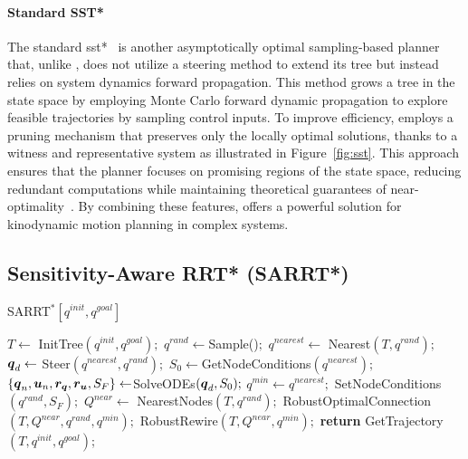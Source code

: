 \paragraph{Standard SST*}

The standard \gls{sst*}~\cite{cSST} is another asymptotically optimal sampling-based planner that, unlike , does not utilize a steering method to extend its tree but instead relies on system dynamics forward propagation.
This method grows a tree in the state space by employing Monte Carlo forward dynamic propagation to explore feasible trajectories by sampling control inputs.
To improve efficiency,  employs a pruning mechanism that preserves only the locally optimal solutions, thanks to a witness and representative system as illustrated in Figure~\ref{fig:sst}.
This approach ensures that the planner focuses on promising regions of the state space, reducing redundant computations while maintaining theoretical guarantees of near-optimality~\cite{cSST}. 
By combining these features,  offers a powerful solution for kinodynamic motion planning in complex systems.

\subsection{Sensitivity-Aware RRT* (SARRT*)}\label{sec:sarrt*}

\begin{algorithm}[h!]
    \caption{SARRT$^* [q^{init}, q^{goal}]$}\label{alg:SARRT*}
    \begin{algorithmic}[1]
        \State $T \gets$ InitTree$({q^{init}, q^{goal}});$
            \State $q^{rand} \gets $Sample()$;$
            \State $q^{nearest} \gets$ Nearest$(T,{q^{rand}});$
            \State $\boldsymbol{q}_d \gets$ Steer$({q^{nearest}},{q^{rand}});$
            \State $S_0 \gets $GetNodeConditions$({q^{nearest}});$
            \State $\left \{\boldsymbol{q}_n, \boldsymbol{u}_n, \boldsymbol{r_q}, \boldsymbol{r_u}, S_F \right \}  \gets $SolveODEs$(\boldsymbol{q}_d, S_0);$
                \State $q^{min} \gets q^{nearest};$
                \State SetNodeConditions$({q^{rand}}, S_{F});$
                \State $Q^{near} \gets$ NearestNodes$(T,{q^{rand}});$
                \State RobustOptimalConnection$(T, Q^{near}, q^{rand}, q^{min});$
                \State RobustRewire$(T, Q^{near}, q^{min});$
            \EndIf
        \EndWhile
        \State \textbf{return} GetTrajectory$(T, q^{init}, q^{goal})$;
    \end{algorithmic}
\end{algorithm}

